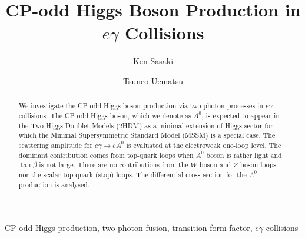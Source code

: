 \documentclass[final,5p,times,twocolumn]{elsarticle}
\begin{document}
\begin{frontmatter}

\title{CP-odd Higgs Boson Production in $e\gamma$ Collisions}


\author[yokohama]{Ken Sasaki}

\author[kyoto]{Tsuneo Uematsu}


\address[yokohama]{ Dept. of Physics, Faculty of Engineering\\
 Yokohama National University, Yokohama 240-8501, Japan}

\address[kyoto]{Institute for Liberal Arts and Sciences,
Kyoto University, Kyoto 606-8501, Japan\\
and Maskwa Institute, Kyoto Sangyo University, Kyoto 603-8555, Japan}


\begin{abstract}
We investigate the CP-odd Higgs boson production via two-photon 
processes in $e\gamma$ collisions. The CP-odd Higgs boson, which we denote as 
$A^0$, is expected to appear in the Two-Higgs Doublet Models (2HDM) as
a minimal extension of Higgs sector for which the Minimal Supersymmetric 
Standard Model (MSSM) is a special case.
The scattering amplitude for $e\gamma\rightarrow eA^0$ is evaluated at the electroweak one-loop level. 
The dominant contribution  comes  
from top-quark loops when $A^0$ boson is rather light and $\tan\beta$ is not 
large. There are no contributions from the 
$W$-boson and $Z$-boson loops nor the scalar top-quark (stop) loops. 
The differential cross section for the $A^0$ production is analysed. 

\end{abstract}

\begin{keyword}
CP-odd Higgs production, two-photon fusion, transition form factor, $e\gamma$-collisions
\end{keyword}

\end{frontmatter} 



\end{document}
